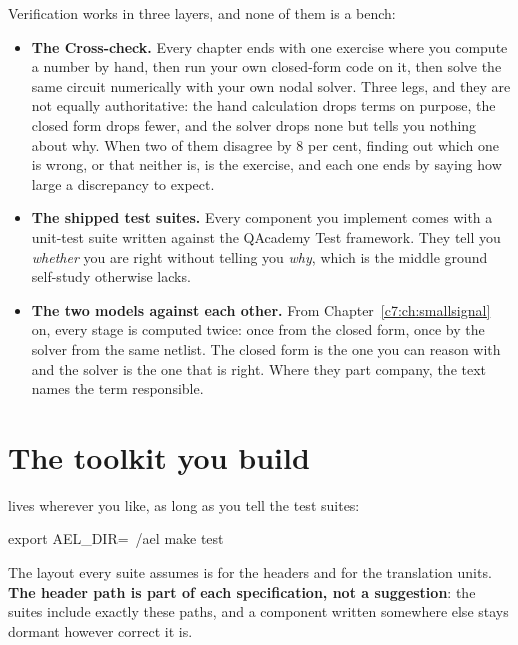Verification works in three layers, and none of them is a bench:
\begin{itemize}
  \item \textbf{The Cross-check.} Every chapter ends with one exercise where you compute a number
    by hand, then run your own closed-form code on it, then solve the same circuit numerically
    with your own nodal solver. Three legs, and they are not equally authoritative: the hand
    calculation drops terms on purpose, the closed form drops fewer, and the solver drops none but
    tells you nothing about why. When two of them disagree by 8 per cent, finding out which one is
    wrong, or that neither is, is the exercise, and each one ends by saying how large a
    discrepancy to expect.
  \item \textbf{The shipped test suites.} Every component you implement comes with a unit-test
    suite written against the QAcademy Test framework. They tell you \emph{whether} you are right
    without telling you \emph{why}, which is the middle ground self-study otherwise lacks.
  \item \textbf{The two models against each other.} From Chapter~\ref{c7:ch:smallsignal} on, every
    stage is computed twice: once from the closed form, once by the solver from the same netlist.
    The closed form is the one you can reason with and the solver is the one that is right. Where
    they part company, the text names the term responsible.
\end{itemize}

\section*{The toolkit you build}
\label{pre:sec:toolkit}
 lives wherever you like, as long as you tell the test suites:

\begin{shell}
export AEL_DIR=~/ael
make test
\end{shell}

\noindent The layout every suite assumes is  for the headers and
 for the translation units. \textbf{The header path is part of each
specification, not a suggestion}: the suites include exactly these paths, and a component written
somewhere else stays dormant however correct it is.

